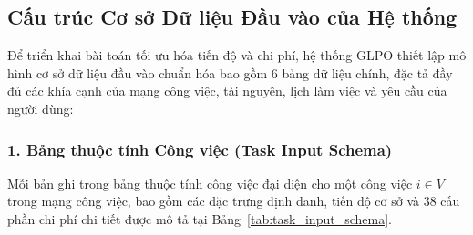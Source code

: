 \subsection{Cấu trúc Cơ sở Dữ liệu Đầu vào của Hệ thống}
Để triển khai bài toán tối ưu hóa tiến độ và chi phí, hệ thống GLPO thiết lập mô hình cơ sở dữ liệu đầu vào chuẩn hóa bao gồm 6 bảng dữ liệu chính, đặc tả đầy đủ các khía cạnh của mạng công việc, tài nguyên, lịch làm việc và yêu cầu của người dùng:

\subsubsection{1. Bảng thuộc tính Công việc (Task Input Schema)}
Mỗi bản ghi trong bảng thuộc tính công việc đại diện cho một công việc $i \in V$ trong mạng công việc, bao gồm các đặc trưng định danh, tiến độ cơ sở và 38 cấu phần chi phí chi tiết được mô tả tại Bảng~\ref{tab:task_input_schema}.

